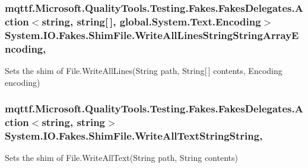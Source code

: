 \hypertarget{class_system_1_1_i_o_1_1_fakes_1_1_shim_file_acc2385ada7d14e34be69f3a4e3f1d00b}{
\subsubsection[{Write\-All\-Lines\-String\-String\-Array\-Encoding}]{\setlength{\rightskip}{0pt plus 5cm}mqttf.\-Microsoft.\-Quality\-Tools.\-Testing.\-Fakes.\-Fakes\-Delegates.\-Action$<$string, string\mbox{[}$\,$\mbox{]}, global.\-System.\-Text.\-Encoding$>$ System.\-I\-O.\-Fakes.\-Shim\-File.\-Write\-All\-Lines\-String\-String\-Array\-Encoding\hspace{0.3cm}{\ttfamily [static]}, {\ttfamily [set]}}}\label{class_system_1_1_i_o_1_1_fakes_1_1_shim_file_acc2385ada7d14e34be69f3a4e3f1d00b}


Sets the shim of File.\-Write\-All\-Lines(\-String path, String\mbox{[}$\,$\mbox{]} contents, Encoding encoding)

\hypertarget{class_system_1_1_i_o_1_1_fakes_1_1_shim_file_ad89748fcb7497e04db01cc766bafabe6}{
\subsubsection[{Write\-All\-Text\-String\-String}]{\setlength{\rightskip}{0pt plus 5cm}mqttf.\-Microsoft.\-Quality\-Tools.\-Testing.\-Fakes.\-Fakes\-Delegates.\-Action$<$string, string$>$ System.\-I\-O.\-Fakes.\-Shim\-File.\-Write\-All\-Text\-String\-String\hspace{0.3cm}{\ttfamily [static]}, {\ttfamily [set]}}}\label{class_system_1_1_i_o_1_1_fakes_1_1_shim_file_ad89748fcb7497e04db01cc766bafabe6}


Sets the shim of File.\-Write\-All\-Text(\-String path, String contents)

